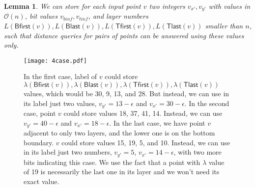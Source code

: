 \documentclass[a4paper,11pt]{article}
\newcommand{\Oh}{\mathcal{O}}
\newcommand{\eps}{\epsilon}
\newcommand{\lam}{\lambda}
\newcommand{\Blast}{\mathsf{Blast}}
\newcommand{\Bfirst}{\mathsf{Bfirst}}
\newcommand{\Tlast}{\mathsf{Tlast}}
\newcommand{\Tfirst}{\mathsf{Tfirst}}
\newtheorem{lemma}[theorem]{Lemma}
\begin{document}
\begin{lemma}
We can store for each input point $v$ two integers $v_{x'},v_{y'}$ with values in $\Oh(n)$, bit values $v_{binf},v_{tinf}$,
and layer numbers $L(\Bfirst(v)),L(\Blast(v)),L(\Tfirst(v)),L(\Tlast(v))$ smaller than $n$,
such that distance queries for pairs of points can be answered using these values only.
\end{lemma}
\label{Lem:Main}

\begin{figure}[h!]
\begin{center}
  \texttt{[image: 4case.pdf]}
\end{center}
\caption{In the first case, label of $v$ could store $\lam(\Bfirst(v)),\lam(\Blast(v)),\lam(\Tfirst(v)),\lam(\Tlast(v))$ 
values, which would be 30, 9, 13, and 28.
But instead, we can use in its label just two values, $v_{y'}=13-\eps$ and $v_{x'}=30-\eps$.
In the second case, point $v$ could store values 18, 37, 41, 14.
Instead, we can use $v_{y'}=40-\eps$ and $v_{x'}=18-\eps$.
\newline In the last case, we have point $v$ adjacent to only two layers,
and the lower one is on the bottom boundary.
$v$ could store values 15, 19, 5, and 10.
Instead, we can use in its label just two numbers, $v_{y'}=5$, $v_{x'}=14-\eps$, with two more bits indicating this case.
We use the fact that a point with $\lam$ value of 19 is necessarily the last one in its layer
and we won't need its exact value.}
\label{Fig:Stored}
\end{figure}
\end{document}
